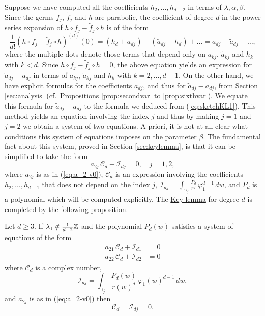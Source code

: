 Suppose we have computed all the coefficients $h_2,...,h_{d-2}$ in terms of $\lambda,\alpha,\beta$. Since the germs $f_j$, $\tilde{f}_j$ and $h$ are parabolic, the coefficient of degree $d$ in the power series expansion of $h\circ f_j-\tilde{f}_j\circ h$ is of the form 
\begin{equation}\label{eq:sketchKL1}
\frac{1}{d!}(h\circ f_j-\tilde{f}_j\circ h)^{(d)}(0)=(h_d+a_{dj})-(\tilde{a}_{dj}+h_d)+\ldots =a_{dj}-\tilde{a}_{dj}+\ldots, 
\end{equation}
where the multiple dots denote those terms that depend only on $a_{kj}$, $\tilde{a}_{kj}$ and $h_k$ with $k<d$. Since $h\circ f_j-\tilde{f}_j\circ h=0$, the above equation yields an expression for $\tilde{a}_{dj}-a_{dj}$ in terms of $a_{kj}$, $\tilde{a}_{kj}$ and $h_k$ with $k=2,...,d-1$. On the other hand, we have explicit formulas for the coefficients $a_{dj}$, and thus for $\tilde{a}_{dj}-a_{dj}$, from Section \ref{sec:analysis} (cf.~Propositions \ref{prop:secondvar} to \ref{prop:sixthvar}). We equate this formula for $\tilde{a}_{dj}-a_{dj}$ to the formula we deduced from (\ref{eq:sketchKL1}). This method yields an equation involving the index $j$ and thus by making $j=1$ and $j=2$ we obtain a system of two equations. A priori, it is not at all clear what conditions this system of equations imposes on the parameter $\beta$. The fundamental fact about this system, proved in Section \ref{sec:keylemma}, is that it can be simplified to take the form
\[ a_{2j}\,\mathcal{C}_d+\mathcal{I}_{dj}=0, \quad j=1,2, \]
where $a_{2j}$ is as in (\ref{eq:a_2-v0}), $\mathcal{C}_d$ is an expression involving the coefficients $h_2,\ldots,h_{d-1}$ that does not depend on the index $j$, $\mathcal{I}_{dj}=\int_{\gamma_j}\frac{P_d}{r^d}\,\varphi_1^{d-1}\,dw$, and $P_d$ is a polynomial which will be computed explicitly. The \hyperref[lemma:key]{Key lemma} for degree $d$ is completed by the following proposition.

\begin{proposition}\label{prop:key}
 Let $d\geq3$. If $\lambda_1\notin\frac{1}{d-2}\mathbb{Z}$ and the polynomial $P_d(w)$ satisfies a system of equations of the form 
\begin{align}
 a_{21}\,\mathcal{C}_d+\mathcal{I}_{d1} &= 0 \nonumber \\
 a_{22}\,\mathcal{C}_d+\mathcal{I}_{d2} &= 0  \label{eq:sketchKL2}
\end{align}
where $\mathcal{C}_d$ is a complex number,
\begin{equation}\label{eq:defId}
 \mathcal{I}_{dj}=\int_{\gamma_j}\frac{P_d(w)}{r(w)^d}\,\varphi_1(w)^{d-1}\,dw, 
\end{equation}
and $a_{2j}$ is as in \textnormal{(\ref{eq:a_2-v0})} then 
\[ \mathcal{C}_d=\mathcal{I}_{dj}=0. \]
\end{proposition}

